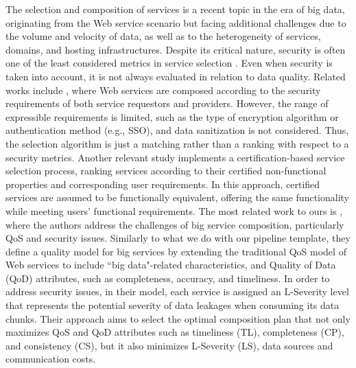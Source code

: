 The selection and composition of services is a recent topic in the era of big data, originating from the Web service scenario but facing additional challenges due to the volume and velocity of data, as well as to the heterogeneity of services, domains, and hosting infrastructures. Despite its critical nature, security is often one of the least considered metrics in service selection \cite{SELLAMI2020102732}. Even when security is taken into account, it is not always evaluated in relation to data quality.
Related works include \cite{secureWScomposition}, where Web services are composed according to the security requirements of both service requestors and providers. However, the range of expressible requirements is limited, such as the type of encryption algorithm or authentication method (e.g., SSO), and data sanitization is not considered. Thus, the selection algorithm is just a matching rather than a ranking with respect to a security metrics.
Another relevant study \cite{9844845} implements a certification-based service selection process, ranking services according to their certified non-functional properties and corresponding user requirements. In this approach, certified services are assumed to be functionally equivalent, offering the same functionality while meeting users' functional requirements.
The most related work to ours is \cite{SELLAMI2020102732}, where the authors address the challenges of big service composition, particularly QoS and security issues. Similarly to what we do with our pipeline template, they define a quality model for big services by extending the traditional QoS model of Web services to include ``big data"-related characteristics, and Quality of Data (QoD) attributes, such as completeness, accuracy, and timeliness. In order to address security issues, in their model, each service is assigned an L-Severity level \cite{Lseverity} that represents the potential severity of data leakages when consuming its data chunks.
Their approach aims to select the optimal composition plan that not only maximizes QoS and QoD attributes such as timeliness (TL), completeness (CP), and consistency (CS), but it also minimizes L-Severity (LS), data sources and communication costs.
